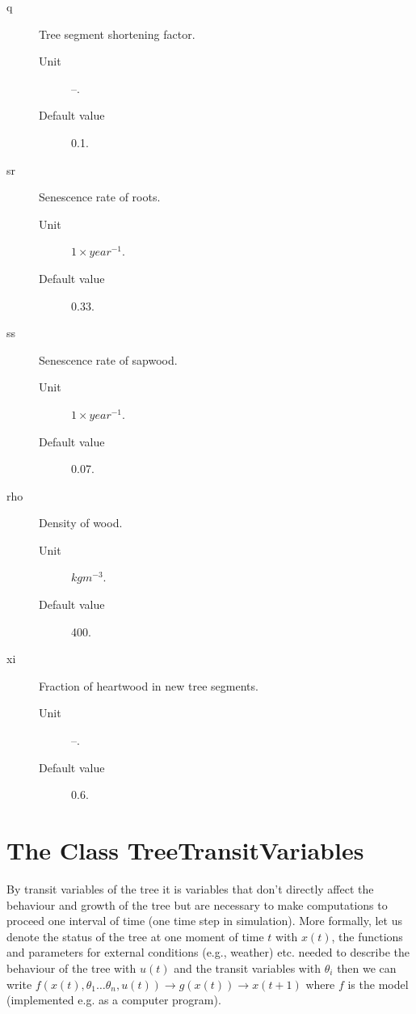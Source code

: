 \begin{description}
\begin{description}
       \end{description}
  \item[q] Tree segment shortening factor.
       \begin{description}
         \item[Unit] --.
         \item[Default value] 0.1.
       \end{description}
  \item[sr] Senescence rate of roots.
       \begin{description}
         \item[Unit] $1 \times year^{-1}$.
         \item[Default value]  0.33.
       \end{description}
  \item[ss] Senescence rate of sapwood.  
       \begin{description}
         \item[Unit] $1 \times year^{-1}$.
         \item[Default value] 0.07.
       \end{description}
  \item[rho] Density of wood. 
       \begin{description}
         \item[Unit] $kgm^{-3}$. 
         \item[Default value] 400.
       \end{description}
  \item[xi] Fraction of heartwood in new tree segments. 
        \begin{description}
          \item[Unit] --.
          \item[Default value] 0.6.
        \end{description}
\end{description}

\section{The Class TreeTransitVariables}

By transit variables of the tree it is variables that don't directly
affect the behaviour and growth of the tree but are necessary to make
computations to proceed one interval of time (one time step in
simulation). More formally, let us denote the status of the tree at
one moment of time $ t $ with $ x(t)$, the functions and parameters
for external conditions (e.g., weather) etc. needed to describe the
behaviour of the tree with $ u(t) $ and the transit variables with $
\theta_{i} $ then we can write $ f(x(t),\theta_{1}\ldots\theta_{n},
u(t)) \rightarrow g(x(t)) \rightarrow x(t+1) $ where $ f $ is the
model (implemented e.g. as a computer program).


